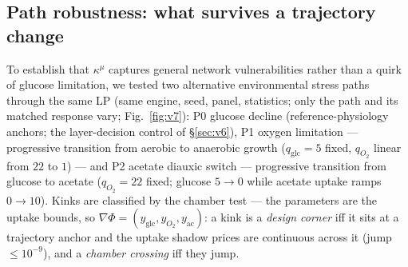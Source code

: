 \documentclass[11pt,a4paper]{article}
\theoremstyle{plain}
\theoremstyle{definition}
\theoremstyle{remark}
\newcommand{\kmu}{\kappa^{\mu}}
\begin{document}
\subsection{Path robustness: what survives a trajectory change}
\label{sec:v7}
To establish that $\kmu$ captures general network vulnerabilities
rather than a quirk of glucose limitation, we tested two alternative
environmental stress paths through the same LP (same engine, seed,
panel, statistics; only the path and its matched response vary;
Fig.~\ref{fig:v7}): P0 glucose decline (reference-physiology anchors;
the layer-decision control of \S\ref{sec:v6}), P1 oxygen limitation
--- progressive transition from aerobic to anaerobic growth
($q_{\mathrm{glc}} = 5$ fixed, $q_{O_2}$ linear from $22$ to $1$) ---
and P2 acetate diauxic switch --- progressive transition from glucose
to acetate ($q_{O_2} = 22$ fixed; glucose $5 \to 0$ while
acetate uptake ramps $0 \to 10$). Kinks are classified by the
chamber test --- the parameters are the uptake bounds, so
$\nabla\Phi = (y_{\mathrm{glc}}, y_{O_2}, y_{\mathrm{ac}})$: a kink is
a \emph{design corner} iff it sits at a trajectory anchor and the
uptake shadow prices are continuous across it (jump $\le 10^{-9}$),
and a \emph{chamber crossing} iff they jump.
\end{document}

